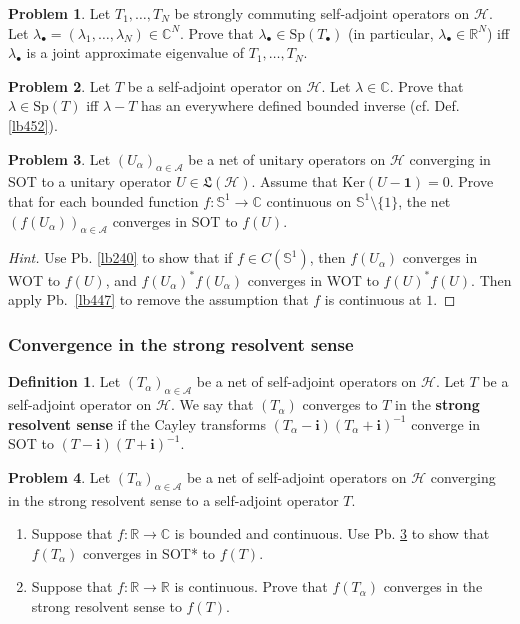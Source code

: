 \documentclass[12pt,b5paper,notitlepage]{article}
\theoremstyle{definition}
\newtheorem{df}{Definition}[subsection]
\newtheorem{prob}{\color{red}Problem}[section]
\theoremstyle{plain}
\newcommand{\fk}{\mathfrak}
\newcommand{\idt}{\mathbf{1}}
\newcommand{\im}{\mathbf{i}}
\newcommand{\blt}{\bullet}
\newcommand{\Cbb}{\mathbb C}
\newcommand{\Rbb}{\mathbb R}
\newcommand{\Ker}{\mathrm{Ker}}
\newcommand{\Sp}{\mathrm{Sp}}
\newcommand{\Sbb}{{\mathbb S}}
\newcommand{\MH}{\mathcal H}
\newcommand{\SA}{\mathscr A}
\numberwithin{equation}{section}
\begin{document}
\begin{prob}
Let $T_1,\dots,T_N$ be strongly commuting self-adjoint operators on $\MH$. Let $\lambda_\blt=(\lambda_1,\dots,\lambda_N)\in\Cbb^N$. Prove that $\lambda_\blt\in\Sp(T_\blt)$ (in particular, $\lambda_\blt\in\Rbb^N$) iff $\lambda_\blt$ is a joint approximate eigenvalue of $T_1,\dots,T_N$.
\end{prob}

\begin{prob}
Let $T$ be a self-adjoint operator on $\MH$. Let $\lambda\in\Cbb$. Prove that $\lambda\in\Sp(T)$ iff $\lambda-T$ has an everywhere defined bounded inverse (cf. Def. \ref{lb452}).
\end{prob}



\begin{prob}\label{lb448}
Let $(U_\alpha)_{\alpha\in\SA}$ be a net of unitary operators on $\MH$ converging in SOT to a unitary operator $U\in\fk L(\MH)$. Assume that $\Ker(U-\idt)=0$. Prove that for each bounded function $f:\Sbb^1\rightarrow\Cbb$ continuous on $\Sbb^1\setminus\{1\}$, the net $(f(U_\alpha))_{\alpha\in\SA}$ converges in SOT to $f(U)$.
\end{prob}

\begin{proof}[Hint]
Use Pb. \ref{lb240} to show that if $f\in C(\Sbb^1)$, then $f(U_\alpha)$ converges in WOT to $f(U)$, and $f(U_\alpha)^*f(U_\alpha)$ converges in WOT to $f(U)^*f(U)$. Then apply Pb.\ \ref{lb447} to remove the assumption that $f$ is continuous at $1$.
\end{proof}


\subsubsection{Convergence in the strong resolvent sense}


\begin{df}
Let $(T_\alpha)_{\alpha\in\SA}$ be a net of self-adjoint operators on $\MH$. Let $T$ be a self-adjoint operator on $\MH$. We say that $(T_\alpha)$ converges to $T$ in the \textbf{strong resolvent sense}  if the Cayley transforms $(T_\alpha-\im)(T_\alpha+\im)^{-1}$ converge in SOT to $(T-\im)(T+\im)^{-1}$.
\end{df}


\begin{prob}
Let $(T_\alpha)_{\alpha\in\SA}$ be a net of self-adjoint operators on $\MH$ converging in the strong resolvent sense to a self-adjoint operator $T$.
\begin{enumerate}
\item Suppose that $f:\Rbb\rightarrow\Cbb$ is bounded and continuous. Use Pb. \ref{lb448} to show that $f(T_\alpha)$ converges in SOT* to $f(T)$. 
\item  Suppose that $f:\Rbb\rightarrow\Rbb$ is continuous. Prove that $f(T_\alpha)$ converges in the strong resolvent sense to $f(T)$.
\end{enumerate}
\end{prob}
\end{document}
